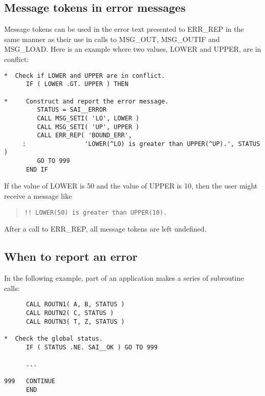 \subsection {Message tokens in error messages} \label{etok_sect}

Message tokens can be used in the error text presented to ERR\_REP
in the same manner as their use in calls to MSG\_OUT, MSG\_OUTIF and 
MSG\_LOAD.
Here is an example where two values, LOWER and UPPER, are in conflict: 

\begin {small}
\begin{verbatim}
*  Check if LOWER and UPPER are in conflict.
      IF ( LOWER .GT. UPPER ) THEN

*     Construct and report the error message.
         STATUS = SAI__ERROR
         CALL MSG_SETI( 'LO', LOWER )
         CALL MSG_SETI( 'UP', UPPER )
         CALL ERR_REP( 'BOUND_ERR', 
     :                'LOWER(^LO) is greater than UPPER(^UP).', STATUS )
         GO TO 999
      END IF
\end{verbatim}
\end {small}

If the value of LOWER is 50 and the value of UPPER is 10, then the user
might receive a message like

\begin {quote}
\begin {small}
\begin{verbatim}
!! LOWER(50) is greater than UPPER(10).
\end{verbatim}
\end {small}
\end {quote}

After a call to ERR\_REP, all message tokens are left undefined.


\subsection {When to report an error} \label{when_sect}

In the following example, part of an application makes a series of subroutine
calls:

\begin {small}
\begin{verbatim}
      CALL ROUTN1( A, B, STATUS )
      CALL ROUTN2( C, STATUS )
      CALL ROUTN3( T, Z, STATUS )

*  Check the global status.
      IF ( STATUS .NE. SAI__OK ) GO TO 999

      ...

999   CONTINUE
      END
\end{verbatim}
\end {small}

